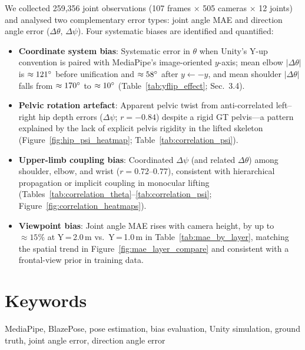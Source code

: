 \documentclass[twocolumn]{article}
\begin{document}
We collected 259,356 joint observations (107 frames $\times$ 505 cameras
$\times$ 12 joints) and analysed two complementary error types: joint angle
MAE and direction angle error ($\Delta\theta$, $\Delta\psi$). Four
systematic biases are identified and quantified:
\begin{itemize}\itemsep0pt
  \item \textbf{Coordinate system bias}: Systematic error in $\theta$ when
        Unity's Y-up convention is paired with MediaPipe's image-oriented
        $y$-axis; mean elbow $|\Delta\theta|$ is $\approx121\degree{}$ before
        unification and $\approx58\degree{}$ after $y \leftarrow -y$, and mean
        shoulder $|\Delta\theta|$ falls from $\approx170\degree{}$ to
        $\approx10\degree{}$
        (Table~\ref{tab:yflip_effect}; Sec.~3.4).
  \item \textbf{Pelvic rotation artefact}: Apparent pelvic twist from
        anti-correlated left--right hip depth errors ($\Delta\psi$;
        $r=-0.84$) despite a rigid GT pelvis---a pattern explained by the lack
        of explicit pelvis rigidity in the lifted skeleton
        (Figure~\ref{fig:hip_psi_heatmap}; Table~\ref{tab:correlation_psi}).
  \item \textbf{Upper-limb coupling bias}: Coordinated $\Delta\psi$ (and
        related $\Delta\theta$) among shoulder, elbow, and wrist
        ($r=0.72$--$0.77$), consistent with hierarchical propagation or
        implicit coupling in monocular lifting
        (Tables~\ref{tab:correlation_theta}--\ref{tab:correlation_psi};
        Figure~\ref{fig:correlation_heatmaps}).
  \item \textbf{Viewpoint bias}: Joint angle MAE rises with camera height,
        by up to ${\approx}15\%$ at Y\,=\,2.0\,m vs.\ Y\,=\,1.0\,m in
        Table~\ref{tab:mae_by_layer}, matching the spatial trend in
        Figure~\ref{fig:mae_layer_compare} and consistent with a
        frontal-view prior in training data.
\end{itemize}

\vspace{-0.8em}

\section*{Keywords}
MediaPipe, BlazePose, pose estimation, bias evaluation, Unity simulation,
ground truth, joint angle error, direction angle error

\vspace{-0.5em}
\end{document}
